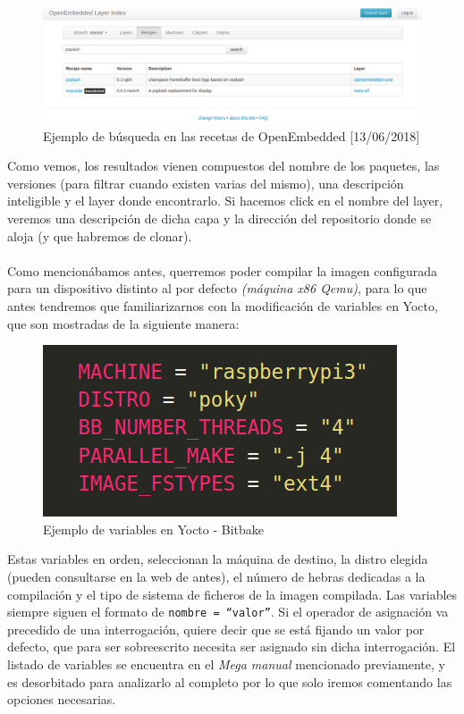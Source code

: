 \begin{figure}[H]
	\centering
	\includegraphics[width=\linewidth]{imagenes/yocto-recipe-search-example.png}
	\caption{Ejemplo de búsqueda en las recetas de OpenEmbedded [13/06/2018]}
	\label{yocto-recipe-search-example}
\end{figure}

Como vemos, los resultados vienen compuestos del nombre de los paquetes, las versiones (para filtrar cuando existen varias del mismo), una descripción inteligible y el layer donde encontrarlo. Si hacemos click en el nombre del layer, veremos una descripción de dicha capa y la dirección del repositorio donde se aloja (y que habremos de clonar).\\

\noindent\makebox[\linewidth]{\rule{\textwidth}{0.4pt}}\\

Como mencionábamos antes, querremos poder compilar la imagen configurada para un dispositivo distinto al por defecto \textit{(máquina x86 Qemu)}, para lo que antes tendremos que familiarizarnos con la modificación de variables en Yocto, que son mostradas de la siguiente manera:

\begin{figure}[H]
	\centering
	\includegraphics[width=0.3\linewidth]{imagenes/yocto-variables-example.png}
	\caption{Ejemplo de variables en Yocto - Bitbake}
	\label{yocto-variables-example}
\end{figure}

Estas variables en orden, seleccionan la máquina de destino, la distro elegida (pueden consultarse en la web de antes), el número de hebras dedicadas a la compilación y el tipo de sistema de ficheros de la imagen compilada. Las variables siempre siguen el formato de \texttt{nombre = ``valor''}. Si el operador de asignación va precedido de una interrogación, quiere decir que se está fijando un valor por defecto, que para ser sobreescrito necesita ser asignado sin dicha interrogación. El listado de variables se encuentra en el \textit{Mega manual} mencionado previamente, y es desorbitado para analizarlo al completo por lo que solo iremos comentando las opciones necesarias.\\

